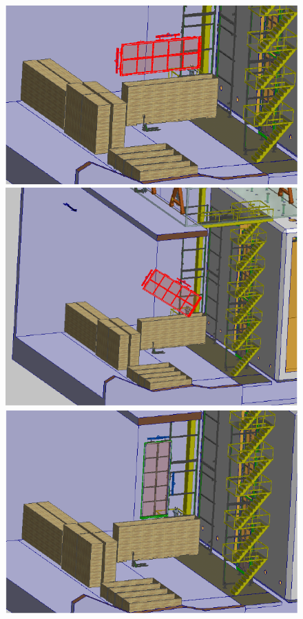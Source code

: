 %
\begin{figure}
\begin{center}
\begin{minipage}[c]{0.32\textwidth}
\includegraphics[width=\textwidth]{far-detector-single-phase/figures/APA-1.pdf}
\end{minipage}
\begin{minipage}[c]{0.32\textwidth}
\includegraphics[width=\textwidth]{far-detector-single-phase/figures/APA-2.pdf}
\end{minipage}
\begin{minipage}[c]{0.32\textwidth}
\includegraphics[width=\textwidth]{far-detector-single-phase/figures/APA-3.pdf}

\end{minipage}
\end{center}
\end{figure}
